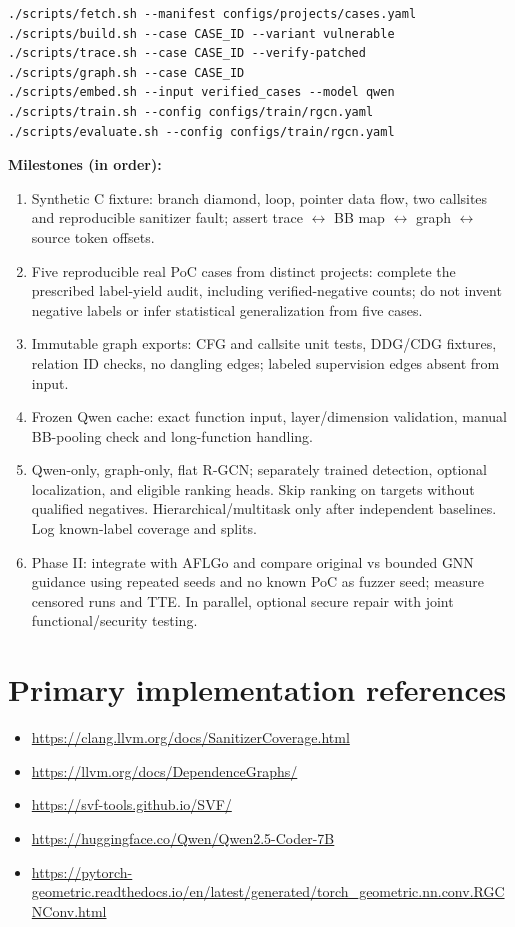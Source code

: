 \documentclass[10pt,a4paper]{article}
\begin{document}
\begin{lstlisting}
./scripts/fetch.sh --manifest configs/projects/cases.yaml
./scripts/build.sh --case CASE_ID --variant vulnerable
./scripts/trace.sh --case CASE_ID --verify-patched
./scripts/graph.sh --case CASE_ID
./scripts/embed.sh --input verified_cases --model qwen
./scripts/train.sh --config configs/train/rgcn.yaml
./scripts/evaluate.sh --config configs/train/rgcn.yaml
\end{lstlisting}
\textbf{Milestones (in order):}
\begin{enumerate}
\item Synthetic C fixture: branch diamond, loop, pointer data flow, two callsites and reproducible sanitizer fault; assert trace $\leftrightarrow$ BB map $\leftrightarrow$ graph $\leftrightarrow$ source token offsets.
\item Five reproducible real PoC cases from distinct projects: complete the prescribed label-yield audit, including verified-negative counts; do not invent negative labels or infer statistical generalization from five cases.
\item Immutable graph exports: CFG and callsite unit tests, DDG/CDG fixtures, relation ID checks, no dangling edges; labeled supervision edges absent from input.
\item Frozen Qwen cache: exact function input, layer/dimension validation, manual BB-pooling check and long-function handling.
\item Qwen-only, graph-only, flat R-GCN; separately trained detection, optional localization, and eligible ranking heads. Skip ranking on targets without qualified negatives. Hierarchical/multitask only after independent baselines. Log known-label coverage and splits.
\item Phase II: integrate with AFLGo and compare original vs bounded GNN guidance using repeated seeds and no known PoC as fuzzer seed; measure censored runs and TTE. In parallel, optional secure repair with joint functional/security testing.
\end{enumerate}

\section*{Primary implementation references}
\begin{itemize}
\item \url{https://clang.llvm.org/docs/SanitizerCoverage.html}
\item \url{https://llvm.org/docs/DependenceGraphs/}
\item \url{https://svf-tools.github.io/SVF/}
\item \url{https://huggingface.co/Qwen/Qwen2.5-Coder-7B}
\item \url{https://pytorch-geometric.readthedocs.io/en/latest/generated/torch_geometric.nn.conv.RGCNConv.html}
\end{itemize}
\end{document}
